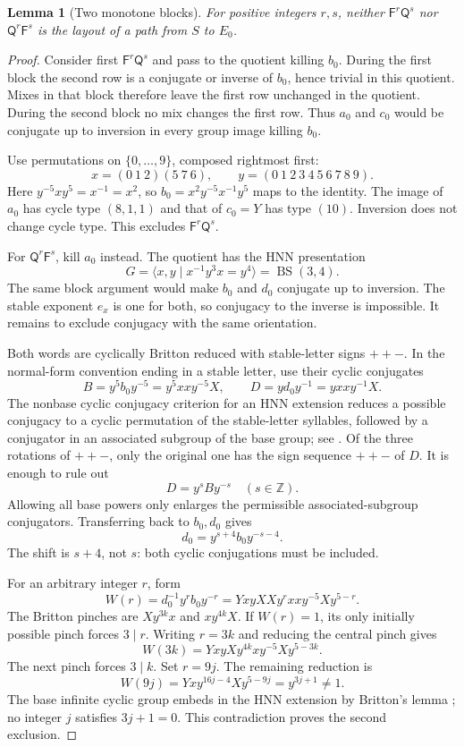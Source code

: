\documentclass[11pt,a4paper]{article}
\newtheorem{lemma}[theorem]{Lemma}
\theoremstyle{definition}\newtheorem{definition}[theorem]{Definition}
\theoremstyle{remark}\newtheorem{remark}[theorem]{Remark}
\newcommand{\F}{\mathsf F}
\newcommand{\Q}{\mathsf Q}
\begin{document}
\begin{lemma}[Two monotone blocks]\label{lem:blocks}
For positive integers $r,s$, neither $\F^r\Q^s$ nor $\Q^r\F^s$ is the layout of a path from $S$ to $E_0$.
\end{lemma}
\begin{proof}
Consider first $\F^r\Q^s$ and pass to the quotient killing $b_0$. During the first block the second row is a conjugate or inverse of $b_0$, hence trivial in this quotient. Mixes in that block therefore leave the first row unchanged in the quotient. During the second block no mix changes the first row. Thus $a_0$ and $c_0$ would be conjugate up to inversion in every group image killing $b_0$.

Use permutations on $\{0,\ldots,9\}$, composed rightmost first:
\[
 x=(0\ 1\ 2)(5\ 7\ 6),\qquad
 y=(0\ 1\ 2\ 3\ 4\ 5\ 6\ 7\ 8\ 9).
\]
Here $y^{-5}xy^5=x^{-1}=x^2$, so $b_0=x^2y^{-5}x^{-1}y^5$ maps to the identity. The image of $a_0$ has cycle type $(8,1,1)$ and that of $c_0=Y$ has type $(10)$. Inversion does not change cycle type. This excludes $\F^r\Q^s$.

For $\Q^r\F^s$, kill $a_0$ instead. The quotient has the HNN presentation
\[
 G=\langle x,y\mid x^{-1}y^3x=y^4\rangle=\operatorname{BS}(3,4).
\]
The same block argument would make $b_0$ and $d_0$ conjugate up to inversion. The stable exponent $e_x$ is one for both, so conjugacy to the inverse is impossible. It remains to exclude conjugacy with the same orientation.

Both words are cyclically Britton reduced with stable-letter signs $++-$. In the normal-form convention ending in a stable letter, use their cyclic conjugates
\[
 B=y^5b_0y^{-5}=y^5xx y^{-5}X,\qquad
 D=yd_0y^{-1}=yxx y^{-1}X.
\]
The nonbase cyclic conjugacy criterion for an HNN extension reduces a possible conjugacy to a cyclic permutation of the stable-letter syllables, followed by a conjugator in an associated subgroup of the base group; see \cite[Theorem 3.9]{BMR}. Of the three rotations of $++-$, only the original one has the sign sequence $++-$ of $D$. It is enough to rule out
\[
 D=y^sBy^{-s}\quad(s\in\mathbb Z).
\]
Allowing all base powers only enlarges the permissible associated-subgroup conjugators. Transferring back to $b_0,d_0$ gives
\[
 d_0=y^{s+4}b_0y^{-s-4}.
\]
The shift is $s+4$, not $s$: both cyclic conjugations must be included.

For an arbitrary integer $r$, form
\[
 W(r)=d_0^{-1}y^rb_0y^{-r}
     =YxyXXy^rxx y^{-5}Xy^{5-r}.
\]
The Britton pinches are $Xy^{3k}x$ and $xy^{4k}X$. If $W(r)=1$, its only initially possible pinch forces $3\mid r$. Writing $r=3k$ and reducing the central pinch gives
\[
 W(3k)=YxyXy^{4k}xy^{-5}Xy^{5-3k}.
\]
The next pinch forces $3\mid k$. Set $r=9j$. The remaining reduction is
\[
 W(9j)=Yxy^{16j-4}Xy^{5-9j}=y^{3j+1}\ne1.
\]
The base infinite cyclic group embeds in the HNN extension by Britton's lemma \cite[Theorem 2.1]{BMR}; no integer $j$ satisfies $3j+1=0$. This contradiction proves the second exclusion.
\end{proof}
\end{document}
